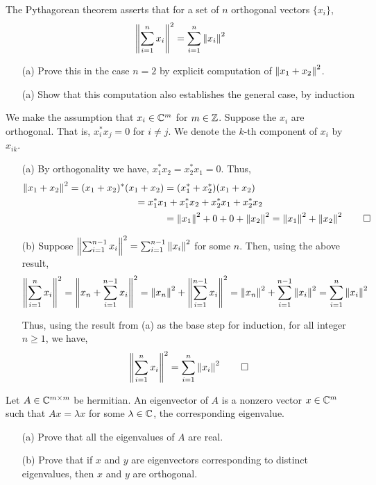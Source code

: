\documentclass[10pt]{article}
\begin{document}
\begin{problem}[Exercise 2.2]
The Pythagorean theorem asserts that for a set of \( n \) orthogonal vectors \( \{x_i\} \),
\[ \left\lVert\sum_{i=1}^{n}x_i\right\rVert^2 = \sum_{i=1}^{n}\left\lVert x_i\right\rVert^2 \]
\begin{enumerate}
	\item[(a)] Prove this in the case \( n=2 \) by explicit computation of \( \left\lVert x_1+x_2\right\rVert^2 \).
	\item[(a)] Show that this computation also establishes the general case, by induction
\end{enumerate}
\end{problem}

\begin{solution}[Solution]
We make the assumption that \( x_i\in\mathbb{C}^m \) for \( m \in \mathbb{Z} \). Suppose the \( x_i \) are orthogonal. That is, \( x_i^*x_j = 0 \) for \( i\neq j \). We denote the \( k \)-th component of \( x_i \) by \( x_{ik} \).
\begin{enumerate}
	\item[(a)] By orthogonality we have, \( x_1^*x_2 = x_2^*x_1 = 0 \). Thus, 
	\begin{align*}
		\norm{x_1+x_2}^2=(x_1+x_2)^*(x_1+x_2) &= (x_1^*+x_2^*)(x_1+x_2) \\
		&\hspace{-3em}=x_1^*x_1+x_1^*x_2+x_2^*x_1+x_2^*x_2 \\
		&=\norm{x_1}^2+0+0+\norm{x_2}^2 = \norm{x_1}^2+\norm{x_2}^2 \tag*{\qed}
	\end{align*}
	
	\item[(b)] Suppose \( \left\lVert\sum_{i=1}^{n-1}x_i\right\rVert^2 = \sum_{i=1}^{n-1}\left\lVert x_i\right\rVert^2 \) for some \( n \). Then, using the above result,
	\[ \left\lVert\sum_{i=1}^{n}x_i\right\rVert^2 = \left\lVert x_n+\sum_{i=1}^{n-1}x_i\right\rVert^2 = \left\lVert x_n\right\rVert^2+\left\lVert\sum_{i=1}^{n-1}x_i\right\rVert^2 = \left\lVert x_n\right\rVert^2+\sum_{i=1}^{n-1}\left\lVert x_i\right\rVert^2 = \sum_{i=1}^{n}\left\lVert x_i\right\rVert^2 \]
	
	Thus, using the result from (a) as the base step for induction, for all integer \( n\geq1 \), we have, \[ \norm{\sum_{i=1}^{n}x_i}^2 = \sum_{i=1}^{n}\norm{x_i}^2  \tag*{\qed}\]
	
\end{enumerate}
\end{solution}
	
\begin{problem}[Exercise 2.3]
Let \( A\in\mathbb{C}^{m\times m } \) be hermitian. An eigenvector of \( A \) is a nonzero vector \( x\in\mathbb{C}^m \) such that \( Ax=\lambda x \) for some \( \lambda\in\mathbb{C} \), the corresponding eigenvalue.
\begin{enumerate}
	\item[(a)] Prove that all the eigenvalues of \( A \) are real.
	\item[(b)] Prove that if \( x \) and \( y \) are eigenvectors corresponding to distinct eigenvalues, then \( x \) and \( y \) are orthogonal.
\end{enumerate}
\end{problem}
\end{document}
